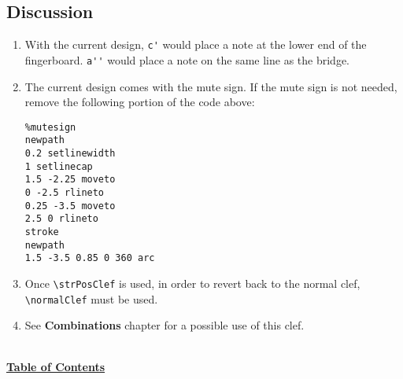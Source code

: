 \subsection{Discussion}
\begin{enumerate}
\item With the current design, \verb|c'| would place a note at the lower end of the fingerboard. \verb|a''| would place a note on the same line as the bridge. 

\item The current design comes with the mute sign. If the mute sign is not needed, remove the following portion of the code above:

\begin{verbatim}
%mutesign
newpath
0.2 setlinewidth
1 setlinecap
1.5 -2.25 moveto
0 -2.5 rlineto
0.25 -3.5 moveto
2.5 0 rlineto
stroke
newpath
1.5 -3.5 0.85 0 360 arc
\end{verbatim}

\item Once \verb|\strPosClef| is used, in order to revert back to the normal clef, \verb|\normalClef| must be used.
\item See \textbf{Combinations} chapter for a possible use of this clef.
\end{enumerate}

\hyperref[sec:toc]{\\ \textbf{Table of Contents}}

\vfill \break


